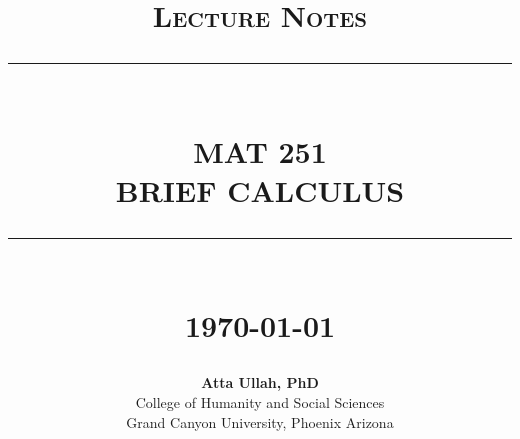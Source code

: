 \newcommand{\HRule}[1]{\rule{\linewidth}{#1}}   %

\makeatletter             %
\def\printtitle{%
    {\centering \@title\par}}
\makeatother                  

\makeatletter             %
\def\printauthor{%
    {\centering \large \@author}}       
\makeatother              

\title{ \normalsize \textsc{Lecture Notes}  %
      \\[2.0cm]               %
      \HRule{0.5pt} \\            %
      \LARGE \textbf{\uppercase{MAT 251 \\
      Brief Calculus}}  %
      \HRule{2pt} \\ [0.5cm]    %
      \normalsize \today      %
    }

\author{
    \textbf{Atta Ullah, PhD}\\
    College of Humanity and Social Sciences \\  
    Grand Canyon University, Phoenix Arizona \\
}


\thispagestyle{empty}   %

\printtitle         %
    \vfill
\printauthor        %
\clearpage
